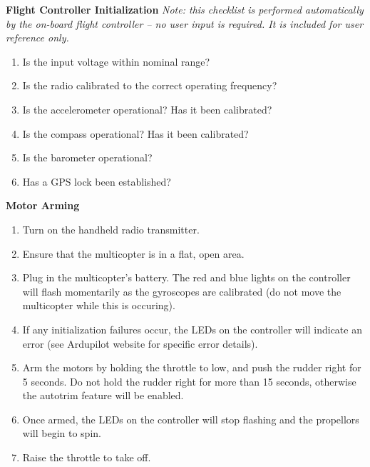 \textbf{Flight Controller Initialization}
\textit{Note: this checklist is performed automatically by the on-board flight controller -- no user input is required. It is included for user reference only.}
\begin{enumerate}
\item Is the input voltage within nominal range?
\item Is the radio calibrated to the correct operating frequency?
\item Is the accelerometer operational? Has it been calibrated?
\item Is the compass operational? Has it been calibrated?
\item Is the barometer operational?
\item Has a GPS lock been established?
\end{enumerate}

\textbf{Motor Arming}
\begin{enumerate}
	\item Turn on the handheld radio transmitter.
	\item Ensure that the multicopter is in a flat, open area.
	\item Plug in the multicopter's battery. The red and blue lights on the controller will flash momentarily as the gyroscopes are calibrated (do not move the multicopter while this is occuring).
	\item If any initialization failures occur, the LEDs on the controller will indicate an error (see Ardupilot website for specific error details).
	\item Arm the motors by holding the throttle to low, and push the rudder right for 5 seconds. Do not hold the rudder right for more than 15 seconds, otherwise the autotrim feature will be enabled.
	\item Once armed, the LEDs on the controller will stop flashing and the propellors will begin to spin.
	\item Raise the throttle to take off.
\end{enumerate}

\clearpage
